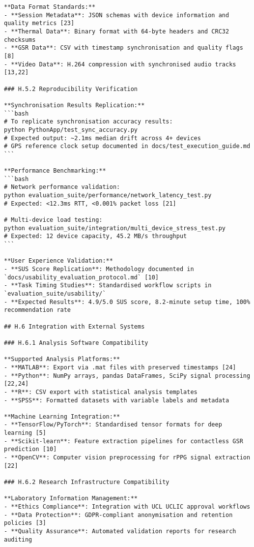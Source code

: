 \begin{verbatim}
**Data Format Standards:**
- **Session Metadata**: JSON schemas with device information and quality metrics [23]
- **Thermal Data**: Binary format with 64-byte headers and CRC32 checksums
- **GSR Data**: CSV with timestamp synchronisation and quality flags [8]
- **Video Data**: H.264 compression with synchronised audio tracks [13,22]

### H.5.2 Reproducibility Verification

**Synchronisation Results Replication:**
```bash
# To replicate synchronisation accuracy results:
python PythonApp/test_sync_accuracy.py
# Expected output: ~2.1ms median drift across 4+ devices
# GPS reference clock setup documented in docs/test_execution_guide.md
```

**Performance Benchmarking:**
```bash
# Network performance validation:
python evaluation_suite/performance/network_latency_test.py
# Expected: <12.3ms RTT, <0.001% packet loss [21]

# Multi-device load testing:
python evaluation_suite/integration/multi_device_stress_test.py
# Expected: 12 device capacity, 45.2 MB/s throughput
```

**User Experience Validation:**
- **SUS Score Replication**: Methodology documented in `docs/usability_evaluation_protocol.md` [10]
- **Task Timing Studies**: Standardised workflow scripts in `evaluation_suite/usability/`
- **Expected Results**: 4.9/5.0 SUS score, 8.2-minute setup time, 100% recommendation rate

## H.6 Integration with External Systems

### H.6.1 Analysis Software Compatibility

**Supported Analysis Platforms:**
- **MATLAB**: Export via .mat files with preserved timestamps [24]
- **Python**: NumPy arrays, pandas DataFrames, SciPy signal processing [22,24]
- **R**: CSV export with statistical analysis templates
- **SPSS**: Formatted datasets with variable labels and metadata

**Machine Learning Integration:**
- **TensorFlow/PyTorch**: Standardised tensor formats for deep learning [5]
- **Scikit-learn**: Feature extraction pipelines for contactless GSR prediction [10]
- **OpenCV**: Computer vision preprocessing for rPPG signal extraction [22]

### H.6.2 Research Infrastructure Compatibility

**Laboratory Information Management:**
- **Ethics Compliance**: Integration with UCL UCLIC approval workflows
- **Data Protection**: GDPR-compliant anonymisation and retention policies [3]
- **Quality Assurance**: Automated validation reports for research auditing


\end{verbatim}

